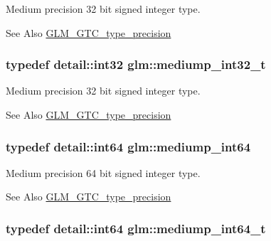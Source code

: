Medium precision 32 bit signed integer type. \begin{DoxySeeAlso}{See Also}
\hyperlink{group__gtc__type__precision}{G\-L\-M\-\_\-\-G\-T\-C\-\_\-type\-\_\-precision} 
\end{DoxySeeAlso}
\hypertarget{group__gtc__type__precision_gafd9b4bd9e4465aec63351b59100692c4}{
\subsubsection[{mediump\-\_\-int32\-\_\-t}]{\setlength{\rightskip}{0pt plus 5cm}typedef detail\-::int32 {\bf glm\-::mediump\-\_\-int32\-\_\-t}}}\label{group__gtc__type__precision_gafd9b4bd9e4465aec63351b59100692c4}
Medium precision 32 bit signed integer type. \begin{DoxySeeAlso}{See Also}
\hyperlink{group__gtc__type__precision}{G\-L\-M\-\_\-\-G\-T\-C\-\_\-type\-\_\-precision} 
\end{DoxySeeAlso}
\hypertarget{group__gtc__type__precision_ga603c695fe5cd677d3f72a81343e19a74}{
\subsubsection[{mediump\-\_\-int64}]{\setlength{\rightskip}{0pt plus 5cm}typedef detail\-::int64 {\bf glm\-::mediump\-\_\-int64}}}\label{group__gtc__type__precision_ga603c695fe5cd677d3f72a81343e19a74}
Medium precision 64 bit signed integer type. \begin{DoxySeeAlso}{See Also}
\hyperlink{group__gtc__type__precision}{G\-L\-M\-\_\-\-G\-T\-C\-\_\-type\-\_\-precision} 
\end{DoxySeeAlso}
\hypertarget{group__gtc__type__precision_ga555a2f85641550c232db473a9bb981f7}{
\subsubsection[{mediump\-\_\-int64\-\_\-t}]{\setlength{\rightskip}{0pt plus 5cm}typedef detail\-::int64 {\bf glm\-::mediump\-\_\-int64\-\_\-t}}}\label{group__gtc__type__precision_ga555a2f85641550c232db473a9bb981f7}
